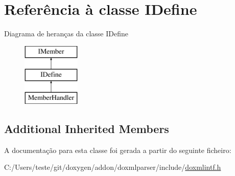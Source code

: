 \hypertarget{class_i_define}{\section{Referência à classe I\-Define}
\label{class_i_define}
}
Diagrama de heranças da classe I\-Define\begin{figure}[H]
\begin{center}
\leavevmode
\includegraphics[height=3.000000cm]{class_i_define}
\end{center}
\end{figure}
\subsection*{Additional Inherited Members}


A documentação para esta classe foi gerada a partir do seguinte ficheiro\-:\begin{DoxyCompactItemize}
\item 
C\-:/\-Users/teste/git/doxygen/addon/doxmlparser/include/\hyperlink{include_2doxmlintf_8h}{doxmlintf.\-h}\end{DoxyCompactItemize}
